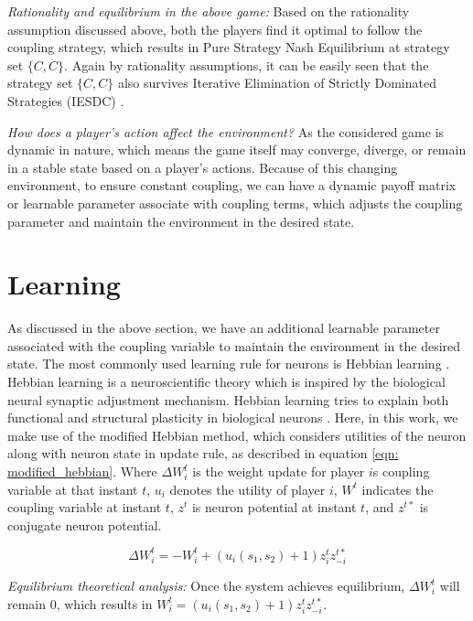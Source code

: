 \documentclass{article}
\begin{document}
\textit{Rationality and equilibrium in the above game:} Based on the rationality assumption discussed above, both the players find it optimal to follow the coupling strategy, which results in Pure Strategy Nash Equilibrium at strategy set $\{C, C\} $. Again by rationality assumptions, it can be easily seen that the strategy set $\{C, C\}$ also survives Iterative Elimination of Strictly Dominated Strategies (IESDC) \cite{narahari2014game}. 

\textit{How does a player's action affect the environment?} As the considered game is dynamic in nature, which means the game itself may converge, diverge, or remain in a stable state based on a player's actions. Because of this changing environment, to ensure constant coupling, we can have a dynamic payoff matrix or learnable parameter associate with coupling terms, which adjusts the coupling parameter and maintain the environment in the desired state.

\section{Learning}
\label{learning}

As discussed in the above section, we have an additional learnable parameter associated with the coupling variable to maintain the environment in the desired state. The most commonly used learning rule for neurons is Hebbian learning \cite{kempter1999hebbian}. Hebbian learning is a neuroscientific theory which is inspired by the biological neural synaptic adjustment mechanism. Hebbian learning tries to explain both functional and structural plasticity in biological neurons \cite{song2000competitive}. Here, in this work, we make use of the modified Hebbian method, which considers utilities of the neuron along with neuron state in update rule, as described in equation \ref{eqn: modified_hebbian}. Where $\Delta W^t_i$ is the weight update for player $i$s coupling variable at that instant $t$, $u_i$ denotes the utility of player $i$, $W^t$ indicates the coupling variable at instant $t$, $z^t$ is neuron potential at instant $t$, and $z^{t*}$ is conjugate neuron potential.  

\begin{equation}
 \label{eqn: modified_hebbian}
 \Delta W^t_i = - W^t_i + (u_i(s_1, s_2) + 1)z^t_{i}z^{t*}_{-i}
\end{equation}

\textit{Equilibrium theoretical analysis:} 
Once the system achieves equilibrium, $\Delta W^t_i$ will remain 0, which results in $W^t_i = (u_i(s_1, s_2) + 1)z^t_iz^{t*}_{-i}$.
\end{document}
